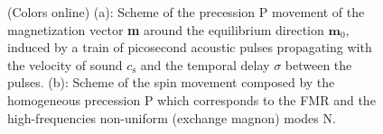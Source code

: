 \documentclass[%
superscriptaddress,
preprint,
showpacs,
amsmath,
amssymb,
aps,
prl,
]{revtex4-1}
\begin{document}
\begin{figure}[ht]
	\centering
	\hspace{0.1\columnwidth} 
	\caption{(Colors online) (a): Scheme of the precession P movement of the magnetization vector \textbf{m} around the equilibrium direction $\mathbf{m}_0$, induced by a train of picosecond acoustic pulses propagating with the velocity of sound $c_\mathrm{s}$ and the temporal delay $\sigma$ between the pulses. (b): Scheme of the spin movement composed by the homogeneous precession P which corresponds to the FMR and the high-frequencies non-uniform (exchange magnon) modes N.}
	\label{fig:schemes}
\end{figure}
\end{document}
